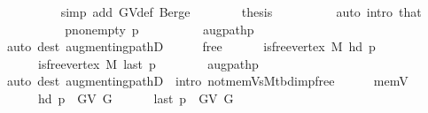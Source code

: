 \begin{isabellebody}
\ \ \ \ \ \ \ \ \isamarkupfalse%
\ {\isacharparenleft}{\kern0pt}simp\ add{\isacharcolon}{\kern0pt}\ G{\isachardot}{\kern0pt}V{\isacharunderscore}{\kern0pt}def\ Berge{\isacharparenright}{\kern0pt}\isanewline
\ \ \ \ \ \ \isamarkupfalse%
\ {\isacharquery}{\kern0pt}thesis\isanewline
\ \ \ \ \ \ \ \ \isamarkupfalse%
\ {\isacharparenleft}{\kern0pt}auto\ intro{\isacharcolon}{\kern0pt}\ that{\isacharparenright}{\kern0pt}\isanewline
\ \ \ \ \isamarkupfalse%
\isanewline
\ \ \ \ \isamarkupfalse%
\ p{\isacharunderscore}{\kern0pt}non{\isacharunderscore}{\kern0pt}empty{\isacharcolon}{\kern0pt}\ {\isachardoublequoteopen}p\ {\isasymnoteq}\ {\isacharbrackleft}{\kern0pt}{\isacharbrackright}{\kern0pt}{\isachardoublequoteclose}\isanewline
\ \ \ \ \ \ \isamarkupfalse%
\ augpath{\isacharunderscore}{\kern0pt}p\isanewline
\ \ \ \ \ \ \isamarkupfalse%
\ {\isacharparenleft}{\kern0pt}auto\ dest{\isacharcolon}{\kern0pt}\ augmenting{\isacharunderscore}{\kern0pt}pathD{\isacharparenleft}{\kern0pt}{}{\isacharparenright}{\kern0pt}{\isacharparenright}{\kern0pt}\isanewline
\ \ \ \ \isamarkupfalse%
\ free{\isacharcolon}{\kern0pt}\isanewline
\ \ \ \ \ \ {\isachardoublequoteopen}is{\isacharunderscore}{\kern0pt}free{\isacharunderscore}{\kern0pt}vertex\ M\ {\isacharparenleft}{\kern0pt}hd\ p{\isacharparenright}{\kern0pt}{\isachardoublequoteclose}\isanewline
\ \ \ \ \ \ {\isachardoublequoteopen}is{\isacharunderscore}{\kern0pt}free{\isacharunderscore}{\kern0pt}vertex\ M\ {\isacharparenleft}{\kern0pt}last\ p{\isacharparenright}{\kern0pt}{\isachardoublequoteclose}\isanewline
\ \ \ \ \ \ \isamarkupfalse%
\ augpath{\isacharunderscore}{\kern0pt}p\isanewline
\ \ \ \ \ \ \isamarkupfalse%
\ {\isacharparenleft}{\kern0pt}auto\ dest{\isacharcolon}{\kern0pt}\ augmenting{\isacharunderscore}{\kern0pt}pathD{\isacharparenleft}{\kern0pt}{}{\isacharcomma}{\kern0pt}\ {}{\isacharparenright}{\kern0pt}\ intro{\isacharcolon}{\kern0pt}\ not{\isacharunderscore}{\kern0pt}mem{\isacharunderscore}{\kern0pt}Vs{\isacharunderscore}{\kern0pt}M{\isacharunderscore}{\kern0pt}tbd{\isacharunderscore}{\kern0pt}imp{\isacharunderscore}{\kern0pt}free{\isacharparenright}{\kern0pt}\isanewline
\ \ \ \ \isamarkupfalse%
\ mem{\isacharunderscore}{\kern0pt}V{\isacharcolon}{\kern0pt}\isanewline
\ \ \ \ \ \ {\isachardoublequoteopen}hd\ p\ {\isasymin}\ G{\isachardot}{\kern0pt}V\ G{\isachardoublequoteclose}\isanewline
\ \ \ \ \ \ {\isachardoublequoteopen}last\ p\ {\isasymin}\ G{\isachardot}{\kern0pt}V\ G{\isachardoublequoteclose}\isanewline

\end{isabellebody}
